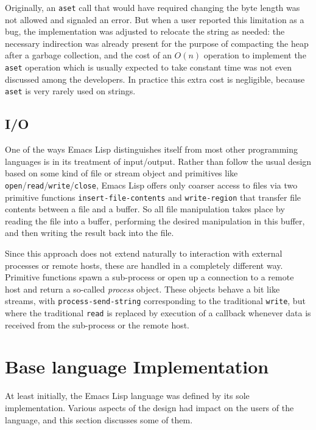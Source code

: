 \documentclass[format=acmsmall, review]{acmart}
\newcommand \Elisp {Emacs Lisp}
\begin{document}
Originally, an \texttt{aset} call that would have required changing the
byte length was not allowed and signaled an error.  But when a user reported
this limitation as a bug, the implementation was adjusted to relocate the
string as needed: the necessary indirection was already present for the
purpose of compacting the heap after a garbage collection, and the cost of
an $O(n)$ operation to implement the \texttt{aset} operation which is
usually expected to take constant time was not even discussed among the
developers. In practice this extra cost is negligible, because
\texttt{aset} is very rarely used on strings.

\subsection{I/O}

One of the ways \Elisp{} distinguishes itself from most other programming
languages is in its treatment of input/output. Rather than follow the usual
design based on some kind of file or stream object and primitives like
\texttt{open}/\texttt{read}/\texttt{write}/\texttt{close}, \Elisp{}
offers only coarser access to files via two primitive functions
\texttt{insert-file-contents} and \texttt{write-region} that transfer file
contents between a file and a buffer.  So all file manipulation takes place
by reading the file into a buffer, performing the desired manipulation in
this buffer, and then writing the result back into the file.

Since this approach does not extend naturally to interaction with external
processes or remote hosts, these are handled in a completely different way.
Primitive functions spawn a sub-process or open up
a connection to a remote host and return a so-called \emph{process} object.
These objects behave  a bit like streams, with \texttt{process-send-string}
corresponding to the traditional \texttt{write}, but where the traditional
\texttt{read} is replaced by execution of a callback whenever data is
received from the sub-process or the remote host.

\section{Base language Implementation}
\label{sec:base-language-implementation}

At least initially, the \Elisp{} language was defined by its sole
implementation.  Various aspects of the design had impact on the users of the
language, and this section discusses some of them.
\end{document}
